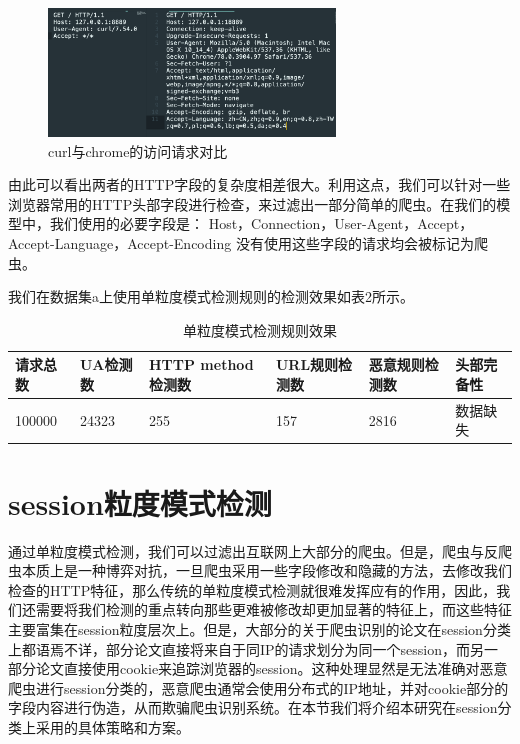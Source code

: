 \documentclass[doctor,privacy,twoside]{buaa_mac}
\begin{document}
\centerline{}
\begin{figure}[!h]
  \centering
  \includegraphics[width=0.68\textwidth]{images/http_request_contrast.png}
  \caption{curl与chrome的访问请求对比}
  \label{fig:logo}
\end{figure}
\centerline{}

由此可以看出两者的HTTP字段的复杂度相差很大。利用这点，我们可以针对一些浏览器常用的HTTP头部字段进行检查，来过滤出一部分简单的爬虫。在我们的模型中，我们使用的必要字段是：
Host，Connection，User-Agent，Accept，Accept-Language，Accept-Encoding
没有使用这些字段的请求均会被标记为爬虫。

我们在数据集a上使用单粒度模式检测规则的检测效果如表2所示。

\centerline{}
\begin{table}[h]
  \caption{单粒度模式检测规则效果}
  \label{tab:papercomponents}
  \centering
\begin{tabular}{|p{2cm}<{\centering}|p{2cm}<{\centering}|p{3cm}<{\centering}|p{2cm}<{\centering}|p{3cm}<{\centering}|p{2cm}<{\centering}|}
    \hline
   请求总数 & UA检测数  & HTTP method检测数 & URL规则检测数 &  恶意规则检测数  & 头部完备性  \\
    \hline
 100000  &  24323     &     255       &        157      &   2816 & 数据缺失 \\

\hline
    \end{tabular}
\end{table}
\centerline{}


\section{session粒度模式检测}
通过单粒度模式检测，我们可以过滤出互联网上大部分的爬虫。但是，爬虫与反爬虫本质上是一种博弈对抗，一旦爬虫采用一些字段修改和隐藏的方法，去修改我们检查的HTTP特征，那么传统的单粒度模式检测就很难发挥应有的作用，因此，我们还需要将我们检测的重点转向那些更难被修改却更加显著的特征上，而这些特征主要富集在session粒度层次上。但是，大部分的关于爬虫识别的论文在session分类上都语焉不详，部分论文直接将来自于同IP的请求划分为同一个session，而另一部分论文直接使用cookie来追踪浏览器的session。这种处理显然是无法准确对恶意爬虫进行session分类的，恶意爬虫通常会使用分布式的IP地址，并对cookie部分的字段内容进行伪造，从而欺骗爬虫识别系统。在本节我们将介绍本研究在session分类上采用的具体策略和方案。
\end{document}
